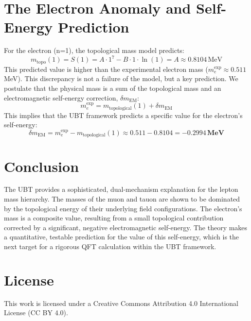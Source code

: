 \documentclass[12pt, a4paper]{article}
\begin{document}
\section{The Electron Anomaly and Self-Energy Prediction}
For the electron (n=1), the topological mass model predicts:
\begin{equation}
    m_{\text{topo}}(1) = S(1) = A \cdot 1^7 - B \cdot 1 \cdot \ln(1) = A \approx 0.8104 \, \text{MeV}
\end{equation}
This predicted value is higher than the experimental electron mass (\(m_e^{\text{exp}} \approx 0.511\) MeV). This discrepancy is not a failure of the model, but a key prediction. We postulate that the physical mass is a sum of the topological mass and an electromagnetic self-energy correction, \( \delta m_{\text{EM}} \):
\begin{equation}
    m_e^{\text{exp}} = m_{\text{topological}}(1) + \delta m_{\text{EM}}
\end{equation}
This implies that the UBT framework predicts a specific value for the electron's self-energy:
\begin{equation}
    \delta m_{\text{EM}} = m_e^{\text{exp}} - m_{\text{topological}}(1) \approx 0.511 - 0.8104 = \mathbf{-0.2994 \, \text{MeV}}
\end{equation}

\section{Conclusion}
The UBT provides a sophisticated, dual-mechanism explanation for the lepton mass hierarchy. The masses of the muon and tauon are shown to be dominated by the topological energy of their underlying field configurations. The electron's mass is a composite value, resulting from a small topological contribution corrected by a significant, negative electromagnetic self-energy. The theory makes a quantitative, testable prediction for the value of this self-energy, which is the next target for a rigorous QFT calculation within the UBT framework.


\section*{License}
This work is licensed under a Creative Commons Attribution 4.0 International License (CC BY 4.0).
\end{document}
